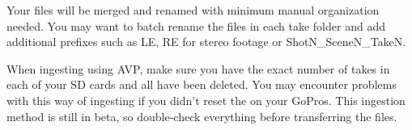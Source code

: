 \begin{fullwidth}
Your files will be merged and renamed with minimum manual organization needed. You may want to batch rename the files in each take folder and add additional prefixes such as LE, RE for stereo footage or ShotN\_SceneN\_TakeN.

\tip When ingesting using AVP, make sure you have the exact number of takes in each of your SD cards and all \textbf{} have been deleted. You may encounter problems with this way of ingesting if you didn't reset the \textbf{} on your GoPros. This ingestion method is still in beta, so double-check everything before transferring the files.

\clearpage
\end{fullwidth}
